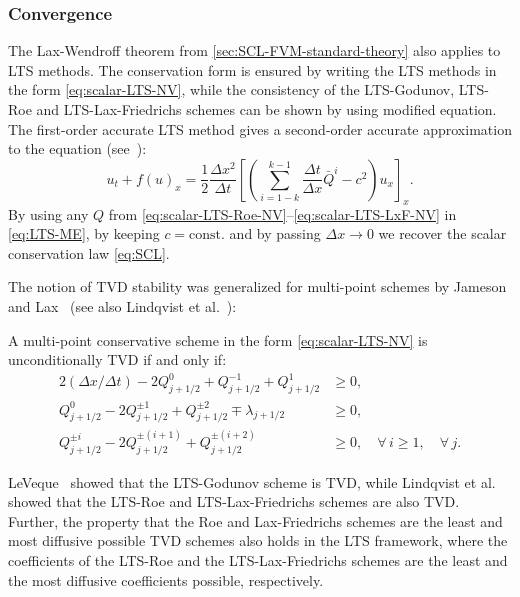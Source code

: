 \subsubsection*{Convergence}

The Lax-Wendroff theorem from \cref{sec:SCL-FVM-standard-theory} also applies to LTS methods. The conservation form is ensured by writing the LTS methods in the form \eqref{eq:scalar-LTS-NV}, while the consistency of the LTS-Godunov, LTS-Roe and LTS-Lax-Friedrichs schemes can be shown by using modified equation. The first-order accurate LTS method gives a second-order accurate approximation to the equation (see~\cite{lin16}):
\begin{equation} \label{eq:LTS-ME}
u_t + f(u)_x = \frac{1}{2} \frac{\Delta x^2}{\Delta t} \left[ \left( \sum\limits_{i=1-k}^{k-1} \frac{\Delta t}{\Delta x} \bar{Q}^i - c^2 \right) u_x \right]_x.
\end{equation}
By using any $ Q $ from \eqref{eq:scalar-LTS-Roe-NV}--\eqref{eq:scalar-LTS-LxF-NV} in \eqref{eq:LTS-ME}, by keeping $ c=\text{const.} $ and by passing $ \Delta x \rightarrow 0 $ we recover the scalar conservation law \eqref{eq:SCL}.

The notion of TVD stability was generalized for multi-point schemes by Jameson and Lax~\cite{jam86,jam87} (see also Lindqvist et al.~\cite{lin16}):
\begin{lemma}
A multi-point conservative scheme in the form \eqref{eq:scalar-LTS-NV} is unconditionally TVD if and only if:
\begin{subequations} \label{eq:LTS-TVD}
\begin{align}
2 \left( \Delta x / \Delta t \right) - 2 Q_{j+1/2}^0 + Q_{j+1/2}^{-1} + Q_{j+1/2}^1 & \geq 0, \label{eq:LTS-TVD-a} \\
Q_{j+1/2}^0 - 2 Q_{j+1/2}^{\pm 1} + Q_{j+1/2}^{\pm 2} \mp \lambda_{j+1/2} & \geq 0, \label{eq:LTS-TVD-b} \\
Q_{j+1/2}^{\pm i} - 2 Q_{j+1/2}^{\pm (i+1)} + Q_{j+1/2}^{\pm (i+2)} & \geq 0, \quad \forall \, i \geq 1, \quad \forall \, j. \label{eq:LTS-TVD-c}
\end{align}
\end{subequations}
\end{lemma}
LeVeque~\cite{lev84} showed that the LTS-Godunov scheme is TVD, while Lindqvist et al.~\cite{lin16} showed that the LTS-Roe and LTS-Lax-Friedrichs schemes are also TVD. Further, the property that the Roe and Lax-Friedrichs schemes are the least and most diffusive possible TVD schemes also holds in the LTS framework, where the coefficients of the LTS-Roe and the LTS-Lax-Friedrichs schemes are the least and the most diffusive coefficients possible, respectively. 

